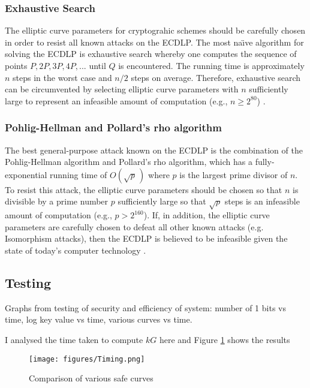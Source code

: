 \documentclass[12pt,a4paper]{article}
\begin{document}
\subsubsection{Exhaustive Search} \label{Exhaustive Search}
The elliptic curve parameters for cryptograhic schemes should be carefully chosen in order to resist all known attacks on the ECDLP. 
The most na\"{\i}ve algorithm for solving the ECDLP is exhaustive search whereby one computes the sequence of points $P,2P,3P,4P,...$ until $Q$ is encountered. 
The running time is approximately $n$ steps in the worst case and $n/2$ steps on average. 
Therefore, exhaustive search can be circumvented by selecting elliptic curve parameters with $n$ sufficiently large to represent an infeasible amount of computation (e.g., $n \geq 2^{80}$) \cite{hankerson2003guide}.

\subsubsection{Pohlig-Hellman and Pollard's rho algorithm} \label{Pohlig-Hellman and Pollard's rho algorithm}
The best general-purpose attack known on the ECDLP is the combination of the Pohlig-Hellman algorithm and Pollard's rho algorithm, 
which has a fully-exponential running time of $O( \sqrt p \,)$ where $p$ is the largest prime divisor of $n$. 
To resist this attack, the elliptic curve parameters should be chosen so that $n$ is divisible by a prime number $p$ sufficiently large 
so that $\sqrt p$ steps is an infeasible amount of computation (e.g., $p > 2^{160}$).
If, in addition, the elliptic curve parameters are carefully chosen to defeat all other known attacks (e.g. Isomorphism attacks), 
then the ECDLP is believed to be infeasible given the state of today's computer technology \cite{hankerson2003guide}.

\subsection{Testing} \label{Testing}
Graphs from testing of security and efficiency of system: number of 1 bits vs time, log key value vs time, various curves vs time.

I analysed the time taken to compute $kG$ here and Figure \ref{fig:curves} shows the results
\begin{figure}[htb]
    \centering
    \texttt{[image: figures/Timing.png]}
    \caption{Comparison of various safe curves}
    \label{fig:curves}
\end{figure}
\end{document}
